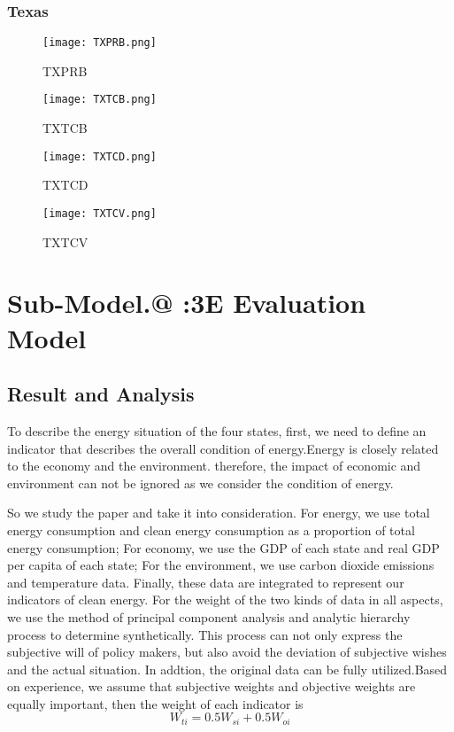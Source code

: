 \documentclass{mcmthesis}
\makeatletter
\newcommand{\Rmnum}[1]{\expandafter\@slowromancap\romannumeral #1@}
\makeatother
\begin{document}
\subsubsection{Texas}
\begin{figure}[H]
\begin{minipage}[htb]{0.5\textwidth}
\centering
\texttt{[image: TXPRB.png]}
\caption{TXPRB} \label{fig:TXPRB}
\end{minipage}
\begin{minipage}[htb]{0.5\textwidth}
\centering
\texttt{[image: TXTCB.png]}
\caption{TXTCB} \label{fig:TXTCB}
\end{minipage}
\end{figure}

\begin{figure}[H]
\begin{minipage}[htb]{0.5\textwidth}
\centering
\texttt{[image: TXTCD.png]}
\caption{TXTCD} \label{fig:TXTCD}
\end{minipage}
\begin{minipage}[htb]{0.5\textwidth}
\centering
\texttt{[image: TXTCV.png]}
\caption{TXTCV} \label{fig:TXTCV}
\end{minipage}
\end{figure}



\section{Sub-Model.\Rmnum{1} :\quad 3E Evaluation Model}
\subsection{Result and Analysis}
To describe the energy situation of the four states, first, we need to define an indicator that describes the overall condition of energy.Energy is closely related to the economy and the environment. therefore, the impact of economic and environment can not be ignored as we consider the condition of energy.

So we study the paper \cite{zhaotao2008energy} and take it into consideration. For energy, we use total energy consumption and clean energy consumption as a proportion of total energy consumption; For economy, we use the GDP of each state and real GDP per capita of each state; For the environment, we use carbon dioxide emissions and temperature data. Finally, these data are integrated to represent our indicators of clean energy.
For the weight of the two kinds of data in all aspects, we use the method of principal component analysis and analytic hierarchy process to determine synthetically. This process can not only express the subjective will of policy makers, but also avoid the deviation of subjective wishes and the actual situation. In addtion, the original data can be fully utilized.Based on experience, we assume that subjective weights and objective weights are equally important, then the weight of each  indicator is
\begin{equation}
  W_{ti} = 0.5 W_{si} + 0.5 W_{oi} 
\end{equation}
\end{document}
